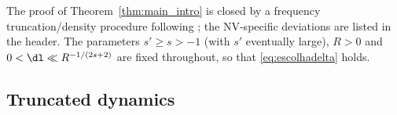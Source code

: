 %

The proof of Theorem~\ref{thm:main_intro} is closed by a frequency
truncation/density procedure following \cite[\S5]{chcora}; the
NV-specific deviations are listed in the header. The parameters
$s'\ge s>-1$ (with $s'$ eventually large), $R>0$ and
$0<\dl\ll R^{-1/(2s+2)}$ are fixed throughout, so that
\eqref{eq:escolhadelta} holds.

\subsection{Truncated dynamics}

